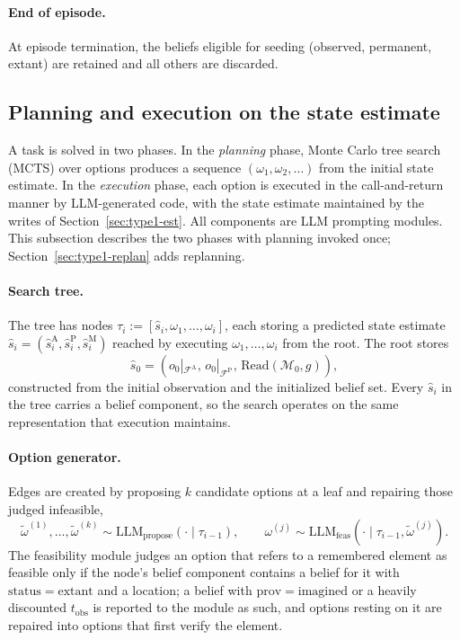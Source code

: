 \documentclass[11pt]{article}
\newcommand{\llm}[1]{\mathrm{LLM}_{\mathrm{#1}}}
\newcommand{\calF}{\mathcal{F}}
\newcommand{\calM}{\mathcal{M}}
\newcommand{\shat}{\hat{s}}
\newcommand{\FA}{\calF^{\mathrm{A}}}
\newcommand{\FP}{\calF^{\mathrm{P}}}
\newcommand{\Read}{\mathrm{Read}}
\newcommand{\prov}{\mathrm{prov}}
\newcommand{\stat}{\mathrm{status}}
\newcommand{\tobs}{t_{\mathrm{obs}}}
\begin{document}
\paragraph{End of episode.}
At episode termination, the beliefs eligible for seeding (observed, permanent, extant) are retained and all others are discarded. 

\subsection{Planning and execution on the state estimate}
\label{sec:type1-plan}

A task is solved in two phases. In the \emph{planning} phase, Monte Carlo tree search (MCTS) over options produces a sequence $(\omega_1,\omega_2,\dots)$ from the initial state estimate. In the \emph{execution} phase, each option is executed in the call-and-return manner by LLM-generated code, with the state estimate maintained by the writes of Section~\ref{sec:type1-est}. All components are LLM prompting modules. This subsection describes the two phases with planning invoked once; Section~\ref{sec:type1-replan} adds replanning.

\paragraph{Search tree.}
The tree has nodes $\tau_i:=[\shat_i,\omega_1,\dots,\omega_i]$, each storing a predicted state estimate $\shat_i=(\hat s^{\mathrm{A}}_i,\hat s^{\mathrm{P}}_i,\hat s^{\mathrm{M}}_i)$ reached by executing $\omega_1,\dots,\omega_i$ from the root. The root stores
\begin{equation}
\shat_0=(o_0|_{\FA},\,o_0|_{\FP},\,\Read(\calM_0,g)),
\label{eq:root}
\end{equation}
constructed from the initial observation and the initialized belief set. Every $\shat_i$ in the tree carries a belief component, so the search operates on the same representation that execution maintains.

\paragraph{Option generator.}
Edges are created by proposing $k$ candidate options at a leaf and repairing those judged infeasible,
\begin{equation}
\tilde\omega^{(1)},\dots,\tilde\omega^{(k)}\sim \llm{propose}(\cdot\mid\tau_{i-1}),\qquad
\omega^{(j)}\sim\llm{feas}(\cdot\mid\tau_{i-1},\tilde\omega^{(j)}).
\label{eq:generator}
\end{equation}
The feasibility module judges an option that refers to a remembered element as feasible only if the node's belief component contains a belief for it with $\stat=\mathrm{extant}$ and a location; a belief with $\prov=\mathrm{imagined}$ or a heavily discounted $\tobs$ is reported to the module as such, and options resting on it are repaired into options that first verify the element.
\end{document}

